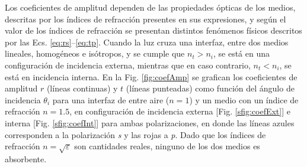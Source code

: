 Los coeficientes  de amplitud dependen de las propiedades ópticas de los medios, descritas por los índices de refracción presentes en sus expresiones, y según el valor de los índices de refracción se presentan distintos fenómenos físicos descritos por las Ecs. \eqref{eq:rs}--\eqref{eq:tp}. Cuando la luz cruza una interfaz, entre dos medios lineales, homogéneos e isótropos, y se cumple que $n_t>n_i$, se está en una configuración de incidencia externa, mientras que en caso contrario, $n_t<n_i$, se está en  incidencia interna. En la Fig. \ref{fig:coefAmp} se grafican los coeficientes de amplitud $r$ (líneas continuas) y $t$ (líneas punteadas) como función del ángulo de incidencia $\theta_i$ para una interfaz de entre aire ($n= 1$) y un medio con un índice de refracción $n = 1.5$, en configuración de incidencia externa [Fig. \ref{sfig:coefExt}] e interna [Fig. \ref{sfig:coefInt}] para ambas polarizaciones, en donde las líneas azules corresponden a la polarización \emph{s} y las rojas a \emph{p}. Dado que los índices de refracción $n = \sqrt{\varepsilon}$ son cantidades reales, ninguno de los dos medios es absorbente. 
%
